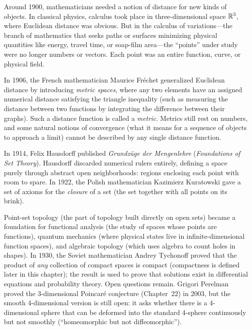 \begin{historybox}
Around 1900, mathematicians needed a notion of distance for new kinds of objects. In classical physics, calculus took place in three-dimensional space $\mathbb{R}^3$, where Euclidean distance was obvious. But in the calculus of variations---the branch of mathematics that seeks paths or surfaces minimizing physical quantities like energy, travel time, or soap-film area---the ``points'' under study were no longer numbers or vectors. Each point was an entire function, curve, or physical field.

In 1906, the French mathematician Maurice Fr\'echet generalized Euclidean distance by introducing \emph{metric spaces}, where any two elements have an assigned numerical distance satisfying the triangle inequality (such as measuring the distance between two functions by integrating the difference between their graphs). Such a distance function is called a \emph{metric}. Metrics still rest on numbers, and some natural notions of convergence (what it means for a sequence of objects to approach a limit) cannot be described by any single distance function.

In 1914, Felix Hausdorff published \emph{Grundz\"uge der Mengenlehre} (\emph{Foundations of Set Theory}). Hausdorff discarded numerical rulers entirely, defining a space purely through abstract open neighborhoods: regions enclosing each point with room to spare. In 1922, the Polish mathematician Kazimierz Kuratowski gave a set of axioms for the \emph{closure} of a set (the set together with all points on its brink).

Point-set topology (the part of topology built directly on open sets) became a foundation for functional analysis (the study of spaces whose points are functions), quantum mechanics (where physical states live in infinite-dimensional function spaces), and algebraic topology (which uses algebra to count holes in shapes). In 1930, the Soviet mathematician Andrey Tychonoff proved that the product of \emph{any} collection of compact spaces is compact (compactness is defined later in this chapter); the result is used to prove that solutions exist in differential equations and probability theory. Open questions remain. Grigori Perelman proved the 3-dimensional Poincar\'e conjecture (Chapter~22) in 2003, but the smooth 4-dimensional version is still open: it asks whether there is a 4-dimensional sphere that can be deformed into the standard 4-sphere continuously but not smoothly (``homeomorphic but not diffeomorphic'').
\end{historybox}

